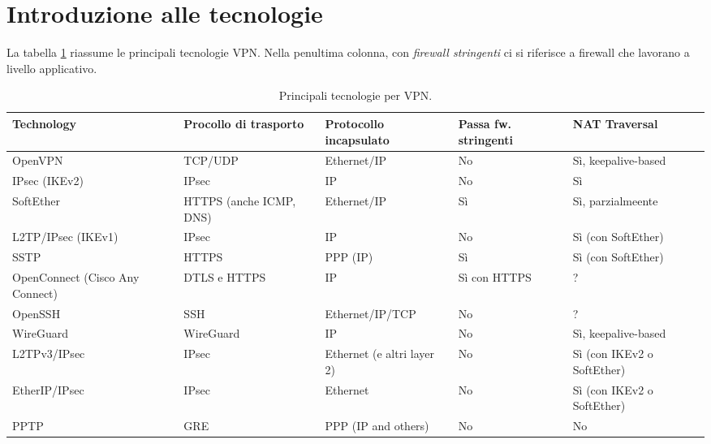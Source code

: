 \section{Introduzione alle tecnologie}
La tabella \ref{tbl:vpn-comparison} riassume le principali tecnologie VPN. Nella
penultima colonna, con \textit{firewall stringenti} ci si riferisce a firewall che
lavorano a livello applicativo.
\begin{table}\label{tbl:vpn-comparison}
  \begin{tabular}{|p{3.3cm}|p{2.7cm}|p{3.1cm}|p{1.7cm}|p{3cm}|}
    \hline
    Technology & Procollo di trasporto & Protocollo incapsulato & Passa fw. stringenti & NAT Traversal\\
    \hline
    OpenVPN & TCP/UDP & Ethernet/IP & No & Sì, keepalive-based\\
    \hline
    IPsec (IKEv2) & IPsec & IP & No & Sì\\
    \hline
    SoftEther & HTTPS (anche ICMP, DNS) & Ethernet/IP & Sì & Sì, parzialmeente\\
    \hline
    L2TP/IPsec (IKEv1) & IPsec & IP & No & Sì (con SoftEther)\\
    \hline
    \hline
    SSTP & HTTPS & PPP (IP) & Sì & Sì (con SoftEther)\\
    \hline
    OpenConnect (Cisco Any Connect)& DTLS e HTTPS & IP & Sì con HTTPS & ?\\
    \hline
    OpenSSH & SSH & Ethernet/IP/TCP & No & ?\\
    \hline
    WireGuard & WireGuard & IP & No & Sì, keepalive-based \\
    \hline
    L2TPv3/IPsec & IPsec & Ethernet (e altri layer 2) & No & Sì (con IKEv2 o SoftEther)\\
    \hline
    EtherIP/IPsec & IPsec & Ethernet & No & Sì (con IKEv2 o SoftEther)\\
    \hline
    PPTP & GRE & PPP (IP and others) & No & No\\
    \hline
  \end{tabular}
  \caption[Tecnolgie per VPN]{Principali tecnologie per VPN.}
\end{table}

